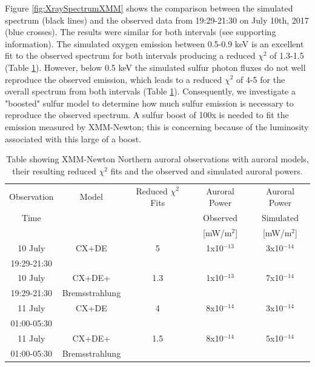 \documentclass[draft]{agujournal2018}
\begin{document}
Figure \ref{fig:XraySpectrumXMM} shows the comparison between the simulated spectrum (black lines) and the observed data from 19:29-21:30 on July 10th, 2017 (blue crosses).
The results were similar for both intervals (see supporting information).
The simulated oxygen emission between 0.5-0.9 keV is an excellent fit to the observed spectrum for both intervals producing a reduced $\chi^2$ of 1.3-1.5 (Table \ref{tab:XMMComparison}).
However, below 0.5 keV the simulated sulfur photon fluxes do not well reproduce the observed emission, which leads to a reduced $\chi^2$ of 4-5 for the overall spectrum from both intervals (Table \ref{tab:XMMComparison}).
Consequently, we investigate a "boosted" sulfur model to determine how much sulfur emission is necessary to reproduce the observed spectrum.
A sulfur boost of 100x is needed to fit the emission measured by XMM-Newton; this is concerning because of the luminosity associated with this large of a boost.

\begin{table}
    \centering
    \begin{tabular}{c|c|c|c|c}
    Observation & Model & Reduced $\chi^2$ Fits & Auroral Power & Auroral Power  \\
    Time &  &  & Observed & Simulated  \\
     &  &  & [mW/m$^2$] & [mW/m$^2$] \\ \cline{1-5}
     10 July     & CX+DE          & 5   & 1x10$^{-13}$ & 3x10$^{-14}$ \\
     19:29-21:30 &                &     &              &              \\ \cline{1-5}
     10 July     & CX+DE+         & 1.3 & 1x10$^{-13}$ & 7x10$^{-14}$ \\
     19:29-21:30 & Bremsstrahlung &     &              &              \\ \cline{1-5}
     11 July     & CX+DE          & 4   & 8x10$^{-14}$ & 3x10$^{-14}$ \\
     01:00-05:30 &                &     &              &              \\ \cline{1-5}
     11 July     & CX+DE+         & 1.5 & 8x10$^{-14}$ & 5x10$^{-14}$ \\
     01:00-05:30 & Bremsstrahlung &     &              &              \\ \cline{1-5}
    \end{tabular}
    \label{tab:XMMComparison}
    \caption{Table showing XMM-Newton Northern auroral observations with auroral models, their resulting reduced $\chi^2$ fits and the observed and simulated auroral powers.}
\end{table}
\end{document}
